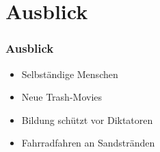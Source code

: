 \section{Ausblick}

\begin{frame}
	\frametitle{Ausblick}
	\begin{itemize}
		\item Selbständige Menschen
		\item Neue Trash-Movies
		\item Bildung schützt vor Diktatoren
		\item Fahrradfahren an Sandstränden
	\end{itemize}
\end{frame}
